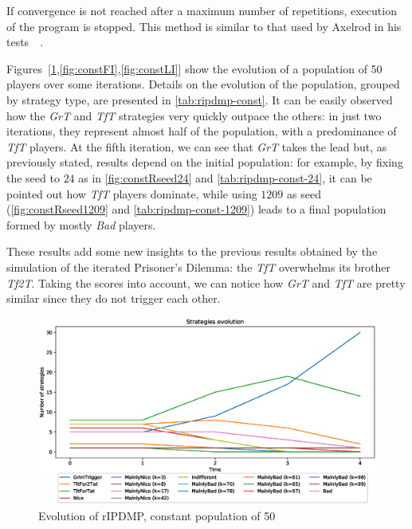 \documentclass[journal,10pt,twoside]{IEEEtran}
\begin{document}
If convergence is not reached after a maximum number of repetitions, execution of the program is stopped.
This method is similar to that used by Axelrod in his tests~\cite[\S 2.6]{mathieu2017}~\cite{axelrod1984evolution}.

Figures~[\ref{fig:constR},\ref{fig:constFI},\ref{fig:constLI}] show the evolution of a population of 50 players over some iterations.
Details on the evolution of the population, grouped by strategy type, are presented in \autoref{tab:ripdmp-const}.
It can be easily observed how the \textit{GrT} and \textit{TfT} strategies very quickly outpace the others: in just two iterations, they represent almost half of the population, with a predominance of \textit{TfT} players. At the fifth iteration, we can see that \textit{GrT} takes the lead but, as previously stated, results depend on the initial population: for example, by fixing the seed to $24$ as in \autoref{fig:constRseed24} and \autoref{tab:ripdmp-const-24}, it can be pointed out how \textit{TfT} players dominate, while using $1209$ as seed (\autoref{fig:constRseed1209} and \autoref{tab:ripdmp-const-1209}) leads to a final population formed by mostly \textit{Bad} players.

These results add some new insights to the previous results obtained by the simulation of the iterated Prisoner's Dilemma: the \textit{TfT} overwhelms its brother \textit{Tf2T}. Taking the scores into account, we can notice how \textit{GrT} and \textit{TfT} are pretty similar since they do not trigger each other.

\begin{figure}[!ht]
    \centering
    \includegraphics[width=1\columnwidth]{../img/ripdmp-const/ripdmp-evolution-const-pop-50}
    \caption{Evolution of rIPDMP, constant population of 50}
    \label{fig:constR}
\end{figure}
\end{document}

